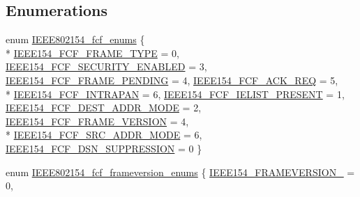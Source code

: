 \subsection*{Enumerations}
\begin{DoxyCompactItemize}
\item 
enum \hyperlink{group___i_e_e_e802154_gaa449478cb5764caa8fb0b7dd3c6d0729}{I\+E\+E\+E802154\+\_\+fcf\+\_\+enums} \{ \\*
\hyperlink{group___i_e_e_e802154_ggaa449478cb5764caa8fb0b7dd3c6d0729ab812aa545153dd786203bd1d147bf96e}{I\+E\+E\+E154\+\_\+\+F\+C\+F\+\_\+\+F\+R\+A\+M\+E\+\_\+\+T\+Y\+PE} = 0, 
\hyperlink{group___i_e_e_e802154_ggaa449478cb5764caa8fb0b7dd3c6d0729a3a183a6e4802f4031135a1b0957fba45}{I\+E\+E\+E154\+\_\+\+F\+C\+F\+\_\+\+S\+E\+C\+U\+R\+I\+T\+Y\+\_\+\+E\+N\+A\+B\+L\+ED} = 3, 
\hyperlink{group___i_e_e_e802154_ggaa449478cb5764caa8fb0b7dd3c6d0729a466db89e2426b730b74731b7ac85bcbb}{I\+E\+E\+E154\+\_\+\+F\+C\+F\+\_\+\+F\+R\+A\+M\+E\+\_\+\+P\+E\+N\+D\+I\+NG} = 4, 
\hyperlink{group___i_e_e_e802154_ggaa449478cb5764caa8fb0b7dd3c6d0729aca559944b3494001f32e25336266884b}{I\+E\+E\+E154\+\_\+\+F\+C\+F\+\_\+\+A\+C\+K\+\_\+\+R\+EQ} = 5, 
\\*
\hyperlink{group___i_e_e_e802154_ggaa449478cb5764caa8fb0b7dd3c6d0729ab9045e1903b340fbbcc7b4e99e806377}{I\+E\+E\+E154\+\_\+\+F\+C\+F\+\_\+\+I\+N\+T\+R\+A\+P\+AN} = 6, 
\hyperlink{group___i_e_e_e802154_ggaa449478cb5764caa8fb0b7dd3c6d0729ad9aa8a1ceb47f21796115a451cae515b}{I\+E\+E\+E154\+\_\+\+F\+C\+F\+\_\+\+I\+E\+L\+I\+S\+T\+\_\+\+P\+R\+E\+S\+E\+NT} = 1, 
\hyperlink{group___i_e_e_e802154_ggaa449478cb5764caa8fb0b7dd3c6d0729a0b086242dd5add3867eb64edc417814b}{I\+E\+E\+E154\+\_\+\+F\+C\+F\+\_\+\+D\+E\+S\+T\+\_\+\+A\+D\+D\+R\+\_\+\+M\+O\+DE} = 2, 
\hyperlink{group___i_e_e_e802154_ggaa449478cb5764caa8fb0b7dd3c6d0729a39aceca9e0f5bb45770f9e58df064e5f}{I\+E\+E\+E154\+\_\+\+F\+C\+F\+\_\+\+F\+R\+A\+M\+E\+\_\+\+V\+E\+R\+S\+I\+ON} = 4, 
\\*
\hyperlink{group___i_e_e_e802154_ggaa449478cb5764caa8fb0b7dd3c6d0729a28f9ed533aeceb46be9f08d81a3591e0}{I\+E\+E\+E154\+\_\+\+F\+C\+F\+\_\+\+S\+R\+C\+\_\+\+A\+D\+D\+R\+\_\+\+M\+O\+DE} = 6, 
\hyperlink{group___i_e_e_e802154_ggaa449478cb5764caa8fb0b7dd3c6d0729ac0e22367452411e9b12419cccb81701c}{I\+E\+E\+E154\+\_\+\+F\+C\+F\+\_\+\+D\+S\+N\+\_\+\+S\+U\+P\+P\+R\+E\+S\+S\+I\+ON} = 0
 \}
\item 
enum \hyperlink{group___i_e_e_e802154_ga9cc0df2fa38563eb499e46cb7aecafd2}{I\+E\+E\+E802154\+\_\+fcf\+\_\+frameversion\+\_\+enums} \{ \hyperlink{group___i_e_e_e802154_gga9cc0df2fa38563eb499e46cb7aecafd2af04fb0c0e3099e5f8925ea505e9fd86e}{I\+E\+E\+E154\+\_\+\+F\+R\+A\+M\+E\+V\+E\+R\+S\+I\+O\+N\+\_} = 0, 

\end{DoxyCompactItemize}
